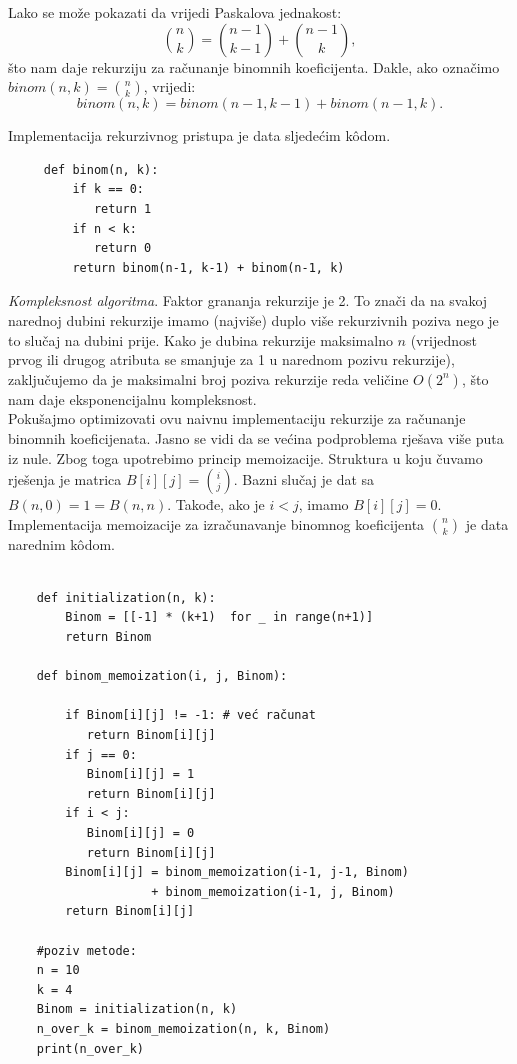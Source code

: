   Lako se može pokazati da vrijedi Paskalova jednakost:
  $$ \binom{n}{k} = \binom{n-1}{k-1} + \binom{n-1}{k},$$
   što nam daje rekurziju za računanje binomnih koeficijenta. Dakle, ako označimo $binom(n, k) = \binom{n}{k}$, vrijedi:
   $$ binom(n, k)= binom(n-1, k-1) + binom(n-1, k).$$
   
   Implementacija rekurzivnog pristupa je data sljedećim k\^odom.
   
   \begin{verbatim}
     def binom(n, k): 
         if k == 0:
            return 1
         if n < k:
            return 0
         return binom(n-1, k-1) + binom(n-1, k)
   \end{verbatim}
  \textit{Kompleksnost algoritma}. Faktor grananja rekurzije je 2. To znači da na svakoj narednoj dubini rekurzije imamo (najviše) duplo više rekurzivnih poziva nego je to slučaj na dubini prije.  Kako je dubina rekurzije maksimalno $n$ (vrijednost prvog ili drugog atributa se smanjuje za 1 u narednom pozivu rekurzije), zaključujemo da je maksimalni broj poziva rekurzije reda veličine $O(2^n)$, što nam daje eksponencijalnu kompleksnost. \\
  
  Pokušajmo optimizovati ovu naivnu implementaciju rekurzije za računanje binomnih koeficijenata.  Jasno se vidi da se većina podproblema rješava više puta iz nule. Zbog toga upotrebimo princip memoizacije. Struktura u koju čuvamo rješenja je matrica $B[i][j]= \binom{i}{j}$. Bazni slučaj je  dat sa $B(n, 0) = 1 = B(n,n)$. Takođe, ako je $i < j$, imamo $B[i][j] = 0$. Implementacija memoizacije za izračunavanje binomnog koeficijenta $\binom{n}{k}$ je data narednim k\^odom. 
  
  \begin{verbatim}
  	
  	def initialization(n, k):
  	    Binom = [[-1] * (k+1)  for _ in range(n+1)] 
  	    return Binom 
  	    
  	def binom_memoization(i, j, Binom): 
  	    
  	    if Binom[i][j] != -1: # već računat
  	       return Binom[i][j] 
  	    if j == 0: 
  	       Binom[i][j] = 1
  	       return Binom[i][j] 
  	    if i < j: 
  	       Binom[i][j] = 0 
  	       return Binom[i][j]
  	    Binom[i][j] = binom_memoization(i-1, j-1, Binom) 
  	                + binom_memoization(i-1, j, Binom) 
  	    return Binom[i][j]

    #poziv metode:
    n = 10
    k = 4
    Binom = initialization(n, k) 
    n_over_k = binom_memoization(n, k, Binom) 
    print(n_over_k)
    
  \end{verbatim}  
  
